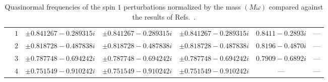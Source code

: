 \begin{table}[ht]
{\begin{tabular}{l |c|c|c|c|c|c}
          & $1$ & $\pm 0.841267-0.289315 i$                 & $\pm 0.841267 -0.289315 i$                 & $\pm 0.841267 -0.289315 i$ & $0.8411-0.2893i$       & ---                         \\
          & $2$ & $\pm 0.818728-0.487838 i$                 & $\pm 0.818728 -0.487838 i$                 & $\pm 0.818728 -0.487838 i$ & $0.8196-0.4870i$       & ---                         \\
          & $3$ & $\pm 0.787748-0.694242 i$                 & $\pm 0.787748 -0.694242 i$                 & $\pm 0.787748 -0.694242 i$ & $0.7909-0.6892i$       & ---                         \\
          & $4$ & $\pm 0.751549-0.910242 i$                 & $\pm 0.751549 -0.910242 i$                 & $\pm 0.751549 -0.910242 i$ & ---                    & ---                         \\
      \hline\hline
    \end{tabular}
  }
  \caption{
    Quasinormal frequencies of the spin $1$ perturbations normalized by the mass $(M\omega)$ compared against the results of Refs.~\cite{Shu:2005fw, Konoplya:2004ip}.
  }
  \label{Tab:Spin1}
\end{table}

